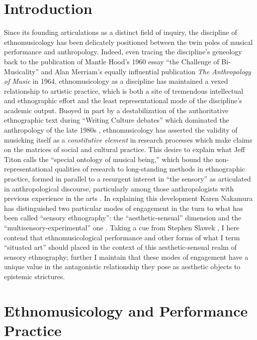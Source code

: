\hypertarget{introduction}{%
\section{Introduction}\label{introduction}}

Since its founding articulations as a distinct field of inquiry, the
discipline of ethnomusicology has been delicately positioned between the
twin poles of musical performance and anthropology. Indeed, even tracing
the discipline's geneology back to the publication of Mantle Hood's 1960
essay ``the Challenge of Bi-Musicality'' and Alan Merriam's equally
influential publication \emph{The Anthropology of Music} in 1964,
ethnomusicology as a discipline has maintained a vexed relationship to
artistic practice, which is both a site of tremendous intellectual and
ethnographic effort and the least representational mode of the
discipline's academic output. Buoyed in part by a destabilization of the
authoritative ethnographic text during ``Writing Culture debates'' which
dominated the anthropology of the late 1980s
\autocite[see:][]{zenker_writing_2014}, ethnomusicology has asserted the
validity of musicking itself as a \emph{constitutive element} in
research processes which make claims on the matrices of social and
cultural practice. This desire to explain what Jeff Titon calls the
``special ontology of musical being,'' which bound the
non-representational qualities of research to long-standing methods in
ethnographic practice, formed in parallel to a resurgent interest in
``the sensory'' as articulated in anthropological discourse,
particularly among those anthropologists with previous experience in the
arts
\autocites[32]{titon_knowing_2008}{ingold_description_2013}{pink_situating_2012}.
In explaining this development Karen Nakamura has distinguished two
particular modes of engagement in the turn to what has been called
``sensory ethnography'': the ``aesthetic-sensual'' dimension and the
``multisensory-experimental'' one \autocite*[133]{nakamura_making_2013}.
Taking a cue from Stephen Slawek \autocite*{slawek_study_1994}, I here
contend that ethnomusicological performance and other forms of what I
term \autocite[after][]{haraway_situated_1988} ``situated art'' should
placed in the context of this aesthetic-sensual realm of sensory
ethnography; further I maintain that these modes of engagement have a
unique value in the antagonistic relationship they pose as aesthetic
objects to epistemic strictures.

\hypertarget{ethnomusicology-and-performance-practice}{%
\section{Ethnomusicology and Performance
Practice}\label{ethnomusicology-and-performance-practice}}

